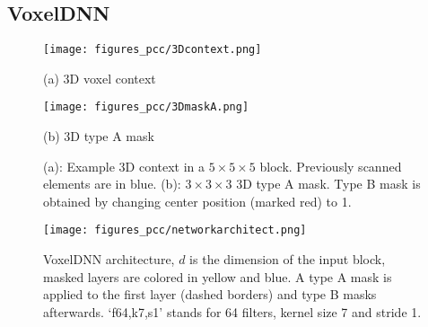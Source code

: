 
\subsection{VoxelDNN}\label{ssec:voxelDNN}

\begin{figure}
\captionsetup{justification=raggedright}
\begin{minipage}[b]{.45\linewidth}
  \centering
  \centerline{\texttt{[image: figures\_pcc/3Dcontext.png]}}
  \centerline{(a) 3D voxel context}\medskip
\end{minipage}
\hfill
\begin{minipage}[b]{0.45\linewidth}
\label{sfig:typeA}
  \centering
  \centerline{\texttt{[image: figures\_pcc/3DmaskA.png]}}
  \centerline{(b) 3D type A mask }\medskip
\end{minipage}
\caption{(a): Example 3D context in a $5 \times 5 \times 5$ block. Previously scanned elements are in blue. (b): $3 \times 3 \times 3$ 3D type A mask. Type B mask is obtained by changing center position (marked red) to 1. }
\label{fig:context}
\end{figure}
%
\begin{figure}[b]
\captionsetup{justification=raggedright}
\texttt{[image: figures\_pcc/networkarchitect.png]}
\caption{VoxelDNN architecture, $d$ is the dimension of the input block, masked layers are colored in yellow and blue. A type A mask is applied to the first layer (dashed borders) and type B masks afterwards. `f64,k7,s1' stands for 64 filters, kernel size 7 and stride 1. }
\label{fig:Networkarchitecture}
\end{figure}



